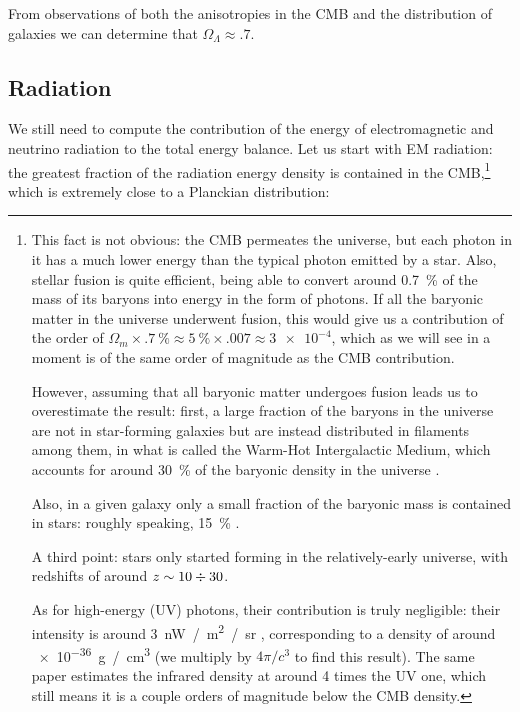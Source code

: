 \documentclass[main.tex]{subfiles}
\begin{document}
From observations of both the anisotropies in the CMB and the distribution of galaxies we can determine that \(\Omega_{\Lambda } \approx \num{.7}\).


\subsection{Radiation}

We still need to compute the contribution of the energy of electromagnetic and neutrino radiation to the total energy balance.
Let us start with EM radiation: the greatest fraction of the radiation energy density is contained in the CMB,\footnote{This fact is not obvious: the CMB permeates the universe, but each photon in it has a much lower energy than the typical photon emitted by a star.
Also, stellar fusion is quite efficient, being able to convert around \SI{0.7}{\percent} of the mass of its baryons into energy in the form of photons. If all the baryonic matter in the universe underwent fusion, this would give us a contribution of the order of \(\Omega_m \times \SI{.7}{\percent} \approx \SI{5}{\percent} \times \num{.007} \approx \num{3e-4}\), which as we will see in a moment is of the same order of magnitude as the CMB contribution.

However, assuming that all baryonic matter undergoes fusion leads us to overestimate the result: first, a large fraction of the baryons in the universe are not in star-forming galaxies but are instead distributed in filaments among them, in what is called the Warm-Hot Intergalactic Medium, which accounts for around \SI{30}{\percent} of the baryonic density in the universe \cite[]{degraaffProbingMissingBaryons2019}. 

Also, in a given galaxy only a small fraction of the baryonic mass is contained in stars: roughly speaking, \SI{15}{\percent} \cite[fig.\ 11]{andreonStellarMassFraction2010}. 

A third point: stars only started forming in the relatively-early universe, with redshifts of around \(z \sim 10 \divisionsymbol 30\). 

As for high-energy (UV) photons, their contribution is truly negligible: their intensity is around \SI{3}{nW / m^2 / sr} \cite[page 2]{collaborationGammarayDeterminationUniverse2018}, corresponding to a density of around \SI{e-36}{g / cm^3} (we multiply by \(4 \pi / c^3\) to find this result). The same paper estimates the infrared density at around 4 times the UV one, which still means it is a couple orders of magnitude below the CMB density.
} which is extremely close to a Planckian distribution: 
\end{document}

